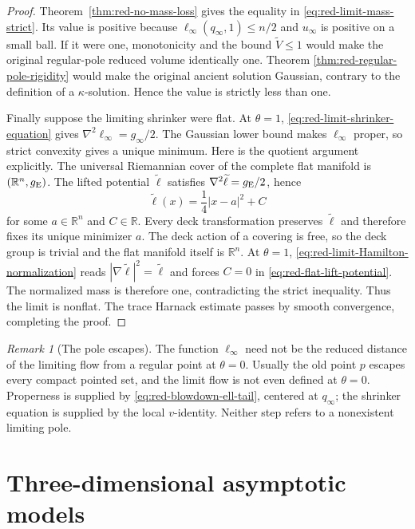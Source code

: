 \documentclass[10pt]{coll-l}
\theoremstyle{definition}
\theoremstyle{remark}
\newtheorem{remark}[theorem]{Remark}
\numberwithin{section}{chapter}
\numberwithin{equation}{chapter}
\begin{document}
\begin{proof}
Theorem~\ref{thm:red-no-mass-loss} gives the equality in
\eqref{eq:red-limit-mass-strict}.  Its value is positive because
$\ell_\infty(q_\infty,1)\leq n/2$ and $u_\infty$ is positive on a small ball.
If it were one, monotonicity and the bound $\widetilde V\leq1$ would make the
original regular-pole reduced volume identically one.  Theorem
\ref{thm:red-regular-pole-rigidity} would make the original ancient solution
Gaussian, contrary to the definition of a $\kappa$-solution.  Hence the
value is strictly less than one.

Finally suppose the limiting shrinker were flat.  At $\theta=1$,
\eqref{eq:red-limit-shrinker-equation} gives
$\nabla^2\ell_\infty=g_\infty/2$.  The Gaussian lower bound makes
$\ell_\infty$ proper, so strict convexity gives a unique minimum.  Here is
the quotient argument explicitly.  The universal Riemannian cover of the
complete flat manifold is $(\mathbb R^n,g_{\rm E})$.  The lifted potential
$\widetilde\ell$ satisfies $\nabla^2\widetilde\ell=g_{\rm E}/2$, hence
\begin{equation}
                 \widetilde\ell(x)=\frac14|x-a|^2+C    \label{eq:red-flat-lift-potential}
\end{equation}
for some $a\in\mathbb R^n$ and $C\in\mathbb R$.  Every deck transformation
preserves $\widetilde\ell$ and therefore fixes its unique minimizer $a$.
The deck action of a covering is free, so the deck group is trivial and the
flat manifold itself is $\mathbb R^n$.  At $\theta=1$,
\eqref{eq:red-limit-Hamilton-normalization} reads
$|\nabla\widetilde\ell|^2=\widetilde\ell$ and forces $C=0$ in
\eqref{eq:red-flat-lift-potential}.  The normalized mass is therefore one,
contradicting the strict inequality.  Thus the limit is nonflat.  The trace
Harnack estimate passes by smooth convergence, completing the proof.
\end{proof}

\begin{remark}[The pole escapes]
\label{rem:red-escaping-pole}
The function $\ell_\infty$ need not be the reduced distance of the limiting
flow from a regular point at $\theta=0$.  Usually the old point $p$ escapes
every compact pointed set, and the limit flow is not even defined at
$\theta=0$.  Properness is supplied by
\eqref{eq:red-blowdown-ell-tail}, centered at $q_\infty$; the shrinker
equation is supplied by the local $v$-identity.  Neither step refers to a
nonexistent limiting pole.
\end{remark}

\section{Three-dimensional asymptotic models}
\label{sec:red-three-models}
\end{document}
